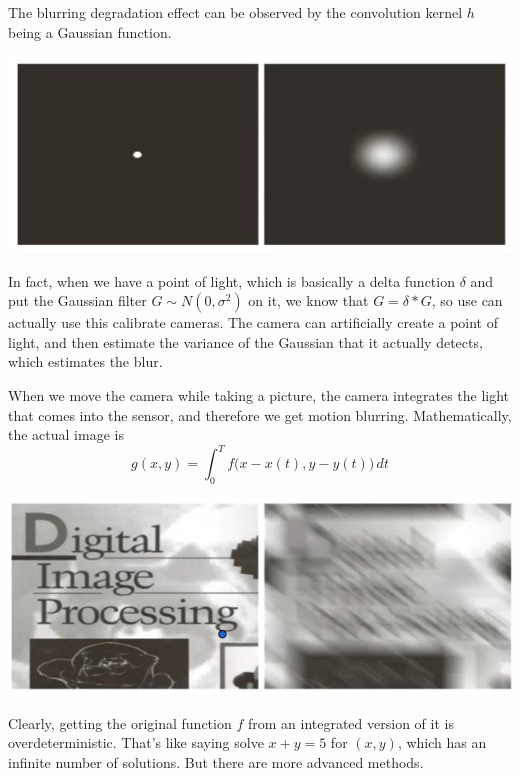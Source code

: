 \documentclass{article}
\begin{document}
    \begin{example}
    The blurring degradation effect can be observed by the convolution kernel $h$ being a Gaussian function. 
    \begin{center}
        \includegraphics[scale=0.3 ]{img/delta_blurring.png}
    \end{center}
    In fact, when we have a point of light, which is basically a delta function $\delta$ and put the Gaussian filter $G \sim N(0, \sigma^2)$ on it, we know that $G = \delta \ast G$, so use can actually use this calibrate cameras. The camera can artificially create a point of light, and then estimate the variance of the Gaussian that it actually detects, which estimates the blur. 
    \end{example}

    \begin{example}
    When we move the camera while taking a picture, the camera integrates the light that comes into the sensor, and therefore we get motion blurring. Mathematically, the actual image is 
    \[g(x, y) = \int_0^T f\big( x - x(t), y - y(t)\big) \,dt\]
    \begin{center}
        \includegraphics[scale=0.3]{img/motion_blurring.png}
    \end{center}
    Clearly, getting the original function $f$ from an integrated version of it is overdeterministic. That's like saying solve $x + y = 5$ for $(x, y)$, which has an infinite number of solutions. But there are more advanced methods. 
    \end{example}
\end{document}
